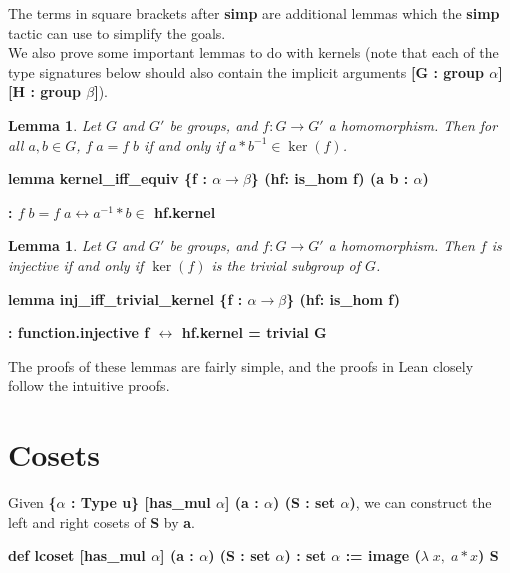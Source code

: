 \documentclass[runningheads,a4paper]{llncs}
\renewcommand{\a}{\alpha}
\renewcommand{\b}{\beta}
\renewcommand{\l}{\lambda}
\renewcommand{\-}{\setminus}
\newtheorem{lemma}[theorem]{Lemma}
\begin{document}
The terms in square brackets after \textbf{simp} are additional lemmas which the \textbf{simp} tactic can use to simplify the goals.\\

We also prove some important lemmas to do with kernels (note that each of the type signatures below should also contain the implicit arguments \textbf{[G : group $\a$] [H : group $\b$]}).

\begin{lemma}
Let $G$ and $G'$ be groups, and $f: G \to G'$ a homomorphism. Then for all $a,b \in G$, $f\; a = f\; b$ if and only if $a * b^{-1} \in \ker (f)$.
\end{lemma}

\vspace{2 mm}
\hspace{2 em}\textbf{lemma kernel\_iff\_equiv \{f : $\a \to \b$\} (hf: is\_hom f) (a b : $\a$)}

\hspace{4 em}\textbf{: $f\; b = f\; a \leftrightarrow a^{-1} * b \in$ hf.kernel}
\vspace{2 mm}

\begin{lemma}
Let $G$ and $G'$ be groups, and $f: G \to G'$ a homomorphism. Then $f$ is injective if and only if $\ker (f)$ is the trivial subgroup of $G$. 
\end{lemma}

\vspace{2 mm}
\hspace{2 em}\textbf{lemma inj\_iff\_trivial\_kernel \{f : $\a \to \b$\} (hf: is\_hom f)}

\hspace{4 em}\textbf{: function.injective f $\leftrightarrow$ hf.kernel = trivial G}
\vspace{2 mm}

The proofs of these lemmas are fairly simple, and the proofs in Lean closely follow the intuitive proofs.

\section{Cosets}

Given \textbf{\{$\a$ : Type u\} [has\_mul $\a$] (a : $\a$) (S : set $\a$)}, we can construct the left and right cosets of \textbf{S} by \textbf{a}.

\vspace{2 mm}
\hspace{2 em}\textbf{def lcoset [has\_mul $\a$] (a : $\a$) (S : set $\a$) : set $\a$ := image ($\l\; x,\; a * x$) S}
\end{document}
